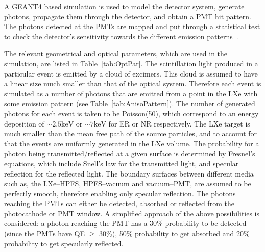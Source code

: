  

A GEANT4 based simulation is used to model the detector system, generate photons, propagate them through the detector, and obtain a PMT hit pattern. The photons detected at the 
PMTs are mapped and put through a statistical test to check the detector's sensitivity towards the different emission patterns~\cite{MaorThesis}.

The relevant geometrical and optical parameters, which are used in the simulation, are listed in Table~\ref{tab:OptPar}. 
The scintillation light produced in a particular 
event is emitted by a cloud of excimers. This cloud is assumed to have a linear size much smaller than that 
of the optical system. Therefore each event is simulated as a number of photons that are emitted from a point 
in the LXe with some emission pattern (see Table~\ref{tab:AnisoPattern}). The number of generated photons for each event is taken to be Poisson(50), which correspond to an energy deposition of $\sim2.5\mathrm{keV}$  or $\sim7\mathrm{keV}$ for ER or NR respectively. The LXe target is much smaller than the mean free path of the source particles, and to 
account for that the events are uniformly generated in the LXe volume.
The probability for a photon being transmitted/reflected at a given surface is 
determined by Fresnel's equations, which include Snell's law for the transmitted light, 
and specular reflection for the reflected light. The boundary surfaces between different media
such as, the LXe--HPFS, HPFS--vacuum and vacuum--PMT, are assumed to be perfectly smooth, 
therefore enabling only specular reflection. 
The photons reaching the PMTs can either be detected, absorbed or reflected from the photocathode 
or PMT window. A simplified approach of the above possibilities is considered:
a photon reaching the PMT has a 30\% probability to be detected (since the PMTs have QE $\geq$ 30\%), 
50\% probability to get absorbed and 20\% probability to get specularly reflected. 

